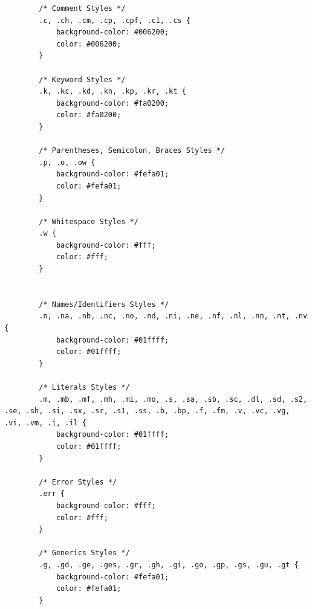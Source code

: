 \documentclass[%
class=scrreprt,
chapterprefix=false,%
open=right,%
twoside=true,%
paper=a4,%
logofile={Logo\_zentral\_farbig\_EN.png},%
thesistype=master,%
UKenglish,%
]{se2thesis}
\theoremstyle{definition}
\begin{document}
	\begin{verbatim}
		/* Comment Styles */
		.c, .ch, .cm, .cp, .cpf, .c1, .cs {
			background-color: #006200;
			color: #006200;
		}
		
		/* Keyword Styles */
		.k, .kc, .kd, .kn, .kp, .kr, .kt {
			background-color: #fa0200;
			color: #fa0200;
		}
		
		/* Parentheses, Semicolon, Braces Styles */
		.p, .o, .ow {
			background-color: #fefa01;
			color: #fefa01;
		}
		
		/* Whitespace Styles */
		.w {
			background-color: #fff;
			color: #fff;
		}
		
		
		/* Names/Identifiers Styles */
		.n, .na, .nb, .nc, .no, .nd, .ni, .ne, .nf, .nl, .nn, .nt, .nv {
			background-color: #01ffff;
			color: #01ffff;
		}
		
		/* Literals Styles */
		.m, .mb, .mf, .mh, .mi, .mo, .s, .sa, .sb, .sc, .dl, .sd, .s2, .se, .sh, .si, .sx, .sr, .s1, .ss, .b, .bp, .f, .fm, .v, .vc, .vg, .vi, .vm, .i, .il {
			background-color: #01ffff;
			color: #01ffff;
		}
		
		/* Error Styles */
		.err {
			background-color: #fff;
			color: #fff;
		}
		
		/* Generics Styles */
		.g, .gd, .ge, .ges, .gr, .gh, .gi, .go, .gp, .gs, .gu, .gt {
			background-color: #fefa01;
			color: #fefa01;
		}
	\end{verbatim}
	\label{lst:model-visual-css}
	
\end{document}

